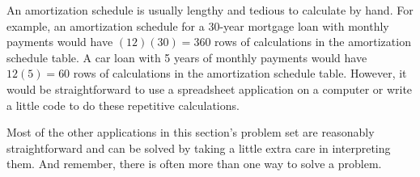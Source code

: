 An amortization schedule is usually lengthy and tedious to calculate by hand. For example, an amortization schedule for a 30-year mortgage loan with monthly payments would have $(12)(30)=360$ rows of calculations in the amortization schedule table. A car loan with 5 years of monthly payments would have $12(5)=60$ rows of calculations in the amortization schedule table. However, it would be straightforward to use a spreadsheet application on a computer or write a little code to do these repetitive calculations.

Most of the other applications in this section's problem set are reasonably straightforward and can be solved by taking a little extra care in interpreting them. And remember, there is often more than one way to solve a problem.